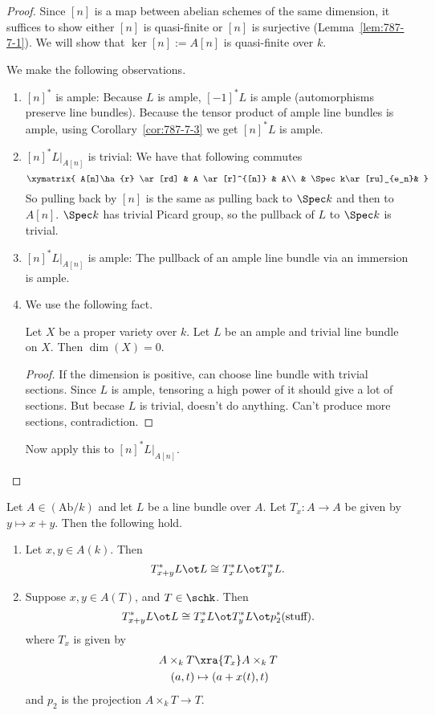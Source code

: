 \begin{proof}
Since $[n]$ is a map between abelian schemes of the same dimension, it suffices to show either $[n]$ is quasi-finite or $[n]$ is surjective (Lemma~\ref{lem:787-7-1}). We will show that $\ker[n]:=A[n]$ is quasi-finite over $k$.

We make the following observations.
\begin{enumerate}
\item
$[n]^*$ is ample: Because $L$ is ample, $[-1]^*L$ is ample (automorphisms preserve line bundles). Because the tensor product of ample line bundles is ample, using Corollary~\ref{cor:787-7-3} we get $[n]^*L$ is ample.
\item
$[n]^*L|_{A[n]}$ is trivial: We have that following commutes
\[
\xymatrix{
A[n]\ha{r} \ar[rd] & A \ar[r]^{[n]} & A\\
& \Spec k\ar[ru]_{e_n}&
}
\]
So pulling back by $[n]$ is the same as pulling back to $\Spec k$ and then to $A[n]$. $\Spec k$ has trivial Picard group, so the pullback of $L$ to $\Spec k$ is trivial.
\item
$[n]^*L|_{A[n]}$ is ample: The pullback of an ample line bundle via an immersion is ample. %
\item
We use the following fact.
\begin{fct}
Let $X$ be a proper variety over $k$. Let $L$ be an ample and trivial line bundle on $X$. Then $\dim (X)=0$.
\end{fct}
\begin{proof}
If the dimension is positive, can choose line bundle with trivial sections. Since $L$ is ample, tensoring a high power of it should give a lot of sections. But becase $L$ is trivial, doesn't do anything. Can't produce more sections, contradiction.
\end{proof}
Now apply this to $[n]^*L|_{A[n]}$.
\end{enumerate}
\end{proof}
\begin{cor}%
Let $A\in (\text{Ab}/k)$ and let $L$ be a line bundle over $A$. Let $T_x:A\to A$ be given by $y\mapsto x+y$. Then the following hold.
\begin{enumerate}
\item Let $x,y\in A(k)$. Then
\[
T_{x+y}^* L\ot L\cong T_x^*L\ot T_y^* L.
\]
\item Suppose $x,y\in A(T)$, and $T\in \schk$. Then
\[
T_{x+y}^* L\ot L\cong T_x^* L\ot T_y^* L\ot p_2^*(\text{stuff}).
\]
where $T_x$ is given by
\begin{align*}
A\times_k T&\xra{T_x} A\times_k T\\
(a,t)&\mapsto (a+x(t),t)
\end{align*}
and $p_2$ is the projection $A\times_k T\to T$.
\end{enumerate}
\end{cor}
